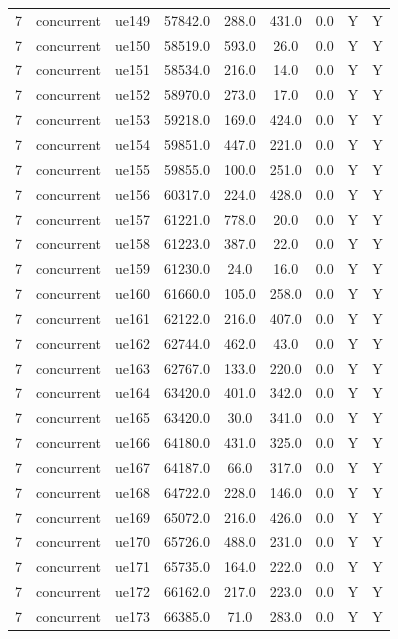 \begin{table}[ht]
\begin{tabular}{|c|c|c|c|c|c|c|c|c|}
7 & concurrent & ue149 & 57842.0 & 288.0 & 431.0 & 0.0 & Y & Y \\
7 & concurrent & ue150 & 58519.0 & 593.0 & 26.0 & 0.0 & Y & Y \\
7 & concurrent & ue151 & 58534.0 & 216.0 & 14.0 & 0.0 & Y & Y \\
7 & concurrent & ue152 & 58970.0 & 273.0 & 17.0 & 0.0 & Y & Y \\
7 & concurrent & ue153 & 59218.0 & 169.0 & 424.0 & 0.0 & Y & Y \\
7 & concurrent & ue154 & 59851.0 & 447.0 & 221.0 & 0.0 & Y & Y \\
7 & concurrent & ue155 & 59855.0 & 100.0 & 251.0 & 0.0 & Y & Y \\
7 & concurrent & ue156 & 60317.0 & 224.0 & 428.0 & 0.0 & Y & Y \\
7 & concurrent & ue157 & 61221.0 & 778.0 & 20.0 & 0.0 & Y & Y \\
7 & concurrent & ue158 & 61223.0 & 387.0 & 22.0 & 0.0 & Y & Y \\
7 & concurrent & ue159 & 61230.0 & 24.0 & 16.0 & 0.0 & Y & Y \\
7 & concurrent & ue160 & 61660.0 & 105.0 & 258.0 & 0.0 & Y & Y \\
7 & concurrent & ue161 & 62122.0 & 216.0 & 407.0 & 0.0 & Y & Y \\
7 & concurrent & ue162 & 62744.0 & 462.0 & 43.0 & 0.0 & Y & Y \\
7 & concurrent & ue163 & 62767.0 & 133.0 & 220.0 & 0.0 & Y & Y \\
7 & concurrent & ue164 & 63420.0 & 401.0 & 342.0 & 0.0 & Y & Y \\
7 & concurrent & ue165 & 63420.0 & 30.0 & 341.0 & 0.0 & Y & Y \\
7 & concurrent & ue166 & 64180.0 & 431.0 & 325.0 & 0.0 & Y & Y \\
7 & concurrent & ue167 & 64187.0 & 66.0 & 317.0 & 0.0 & Y & Y \\
7 & concurrent & ue168 & 64722.0 & 228.0 & 146.0 & 0.0 & Y & Y \\
7 & concurrent & ue169 & 65072.0 & 216.0 & 426.0 & 0.0 & Y & Y \\
7 & concurrent & ue170 & 65726.0 & 488.0 & 231.0 & 0.0 & Y & Y \\
7 & concurrent & ue171 & 65735.0 & 164.0 & 222.0 & 0.0 & Y & Y \\
7 & concurrent & ue172 & 66162.0 & 217.0 & 223.0 & 0.0 & Y & Y \\
7 & concurrent & ue173 & 66385.0 & 71.0 & 283.0 & 0.0 & Y & Y \\

\end{tabular}
\end{table}
